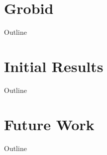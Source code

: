 \documentclass{beamer}
\begin{document}

\section{Grobid}
\begin{frame}[noframenumbering]{Outline}
\tableofcontents[currentsection]
\end{frame}


\section{Initial Results}
\begin{frame}[noframenumbering]{Outline}
\tableofcontents[currentsection]
\end{frame}


\section{Future Work}
\begin{frame}[noframenumbering]{Outline}
\tableofcontents[currentsection]
\end{frame}

\end{document}
